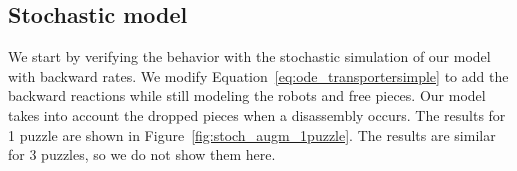 	\subsection{Stochastic model} %
	\label{sub:stochastic_model}
		We start by verifying the behavior with the stochastic simulation of our model with backward rates. We modify Equation~\eqref{eq:ode_transportersimple} to add the backward reactions while still modeling the robots and free pieces. Our model takes into account the dropped pieces when a disassembly occurs. The results for 1 puzzle are shown in Figure~\ref{fig:stoch_augm_1puzzle}. The results are similar for 3 puzzles, so we do not show them here.
		
			\begin{figure}[h!]
				\begin{center}
					

\end{center}
\end{figure}

